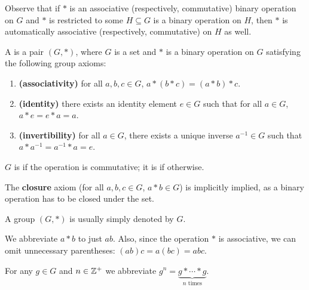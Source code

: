 \begin{remark}
Observe that if $\ast$ is an associative (respectively, commutative) binary operation on $G$ and $\ast$ is restricted to some $H\subseteq G$ is a binary operation on $H$, then $\ast$ is automatically associative (respectively, commutative) on $H$ as well.
\end{remark}

\begin{definition}
A  is a pair $(G,\ast)$, where $G$ is a set and $\ast$ is a binary operation on $G$ satisfying the following group axioms:
\begin{enumerate}[label=(\roman*)]
\item \textbf{(associativity)} for all $a,b,c \in G$, $a \ast (b \ast c)=(a \ast b) \ast c$.
\item \textbf{(identity)} there exists an identity element $e \in G$ such that for all $a\in G$, $a \ast e = e \ast a = a$.
\item \textbf{(invertibility)} for all $a \in G$, there exists a unique inverse $a^{-1} \in G$ such that $a \ast a^{-1} = a^{-1} \ast a = e$.
\end{enumerate}

$G$ is  if the operation is commutative; it is  if otherwise.
\end{definition}

\begin{remark}
The \textbf{closure} axiom (for all $a,b,c \in G$, $a\ast b\in G$) is implicitly implied, as a binary operation has to be closed under the set.
\end{remark}

\begin{notation}
A group $(G,\ast)$ is usually simply denoted by $G$.
\end{notation}

\begin{notation}
We abbreviate $a \ast b$ to just $ab$. Also, since the operation $\ast$ is associative, we can omit unnecessary parentheses: $(ab)c = a(bc) = abc$.
\end{notation}

\begin{notation}
For any $g\in G$ and $n\in\mathbb Z^+$ we abbreviate $g^n=\underbrace{g \ast \cdots \ast g}_{n\text{ times}}$.
\end{notation}

